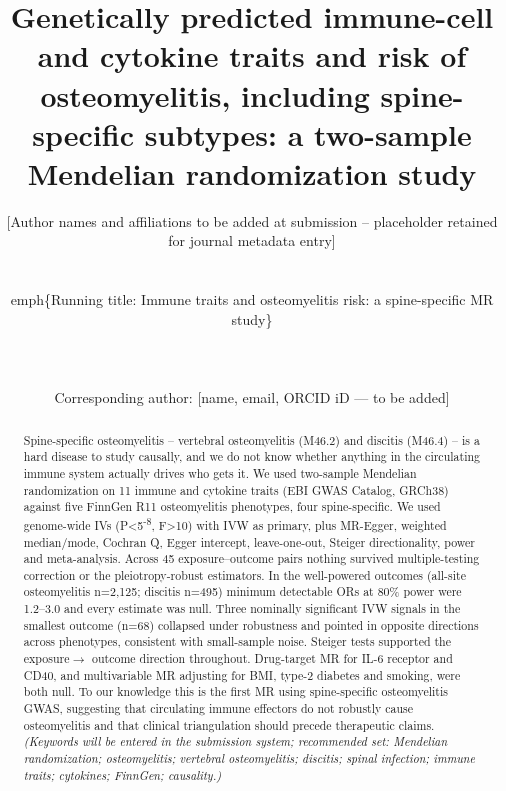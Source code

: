 \documentclass[11pt]{article}
\begin{document}
\title{Genetically predicted immune-cell and cytokine traits and risk of osteomyelitis, including spine-specific subtypes: a two-sample Mendelian randomization study}
\author{[Author names and affiliations to be added at submission -- placeholder retained for journal metadata entry]\\\\ \\emph\{Running title: Immune traits and osteomyelitis risk: a spine-specific MR study\}\\\\ [Affiliations: departments, institutions, city, country --- to be added]\\\\ Corresponding author: [name, email, ORCID iD --- to be added]}
\date{}
\maketitle

\begin{abstract}
Spine-specific osteomyelitis -- vertebral osteomyelitis (M46.2) and discitis (M46.4) -- is a hard disease to study causally, and we do not know whether anything in the circulating immune system actually drives who gets it. We used two-sample Mendelian randomization on 11 immune and cytokine traits (EBI GWAS Catalog, GRCh38) against five FinnGen R11 osteomyelitis phenotypes, four spine-specific. We used genome-wide IVs (P<5\textsuperscript{-8}, F>10) with IVW as primary, plus MR-Egger, weighted median/mode, Cochran Q, Egger intercept, leave-one-out, Steiger directionality, power and meta-analysis. Across 45 exposure--outcome pairs nothing survived multiple-testing correction or the pleiotropy-robust estimators. In the well-powered outcomes (all-site osteomyelitis n=2,125; discitis n=495) minimum detectable ORs at 80\% power were 1.2--3.0 and every estimate was null. Three nominally significant IVW signals in the smallest outcome (n=68) collapsed under robustness and pointed in opposite directions across phenotypes, consistent with small-sample noise. Steiger tests supported the exposure$\rightarrow$ outcome direction throughout. Drug-target MR for IL-6 receptor and CD40, and multivariable MR adjusting for BMI, type-2 diabetes and smoking, were both null. To our knowledge this is the first MR using spine-specific osteomyelitis GWAS, suggesting that circulating immune effectors do not robustly cause osteomyelitis and that clinical triangulation should precede therapeutic claims.
\emph{(Keywords will be entered in the submission system; recommended set: Mendelian randomization; osteomyelitis; vertebral osteomyelitis; discitis; spinal infection; immune traits; cytokines; FinnGen; causality.)}
\end{abstract}
\end{document}
